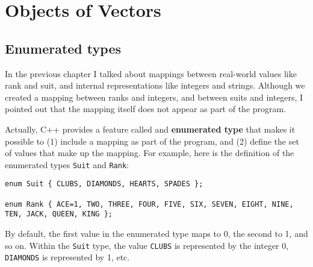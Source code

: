 





\chapter{Objects of Vectors}

\section{Enumerated types}

In the previous chapter I talked about mappings between
real-world values like rank and suit, and internal representations
like integers and strings.  Although we created a mapping between
ranks and integers, and between suits and integers, I pointed
out that the mapping itself does not appear as part of the
program.

Actually, C++ provides a feature called and {\bf enumerated type}
that makes it possible to (1) include a mapping as part of the
program, and (2) define the set of values that make up the
mapping.  For example, here is the definition
of the enumerated types {\tt Suit} and {\tt Rank}:

\begin{verbatim}
enum Suit { CLUBS, DIAMONDS, HEARTS, SPADES };

enum Rank { ACE=1, TWO, THREE, FOUR, FIVE, SIX, SEVEN, EIGHT, NINE,
TEN, JACK, QUEEN, KING };
\end{verbatim}
%
By default, the first value in the enumerated type maps to
0, the second to 1, and so on.  Within the {\tt Suit} type, the value
{\tt CLUBS} is represented by the integer 0, {\tt DIAMONDS} is
represented by 1, etc.

